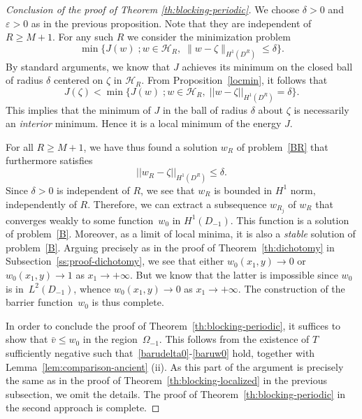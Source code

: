 \documentclass[a4paper,12pt,fullpage]{article}
\numberwithin{equation}{section}
\def\ep{\varepsilon}
\begin{document}
\begin{proof}[Conclusion of the proof of Theorem \ref{th:blocking-periodic}]

We choose $\delta>0$ and $\ep >0$ as in the previous proposition. Note that they are independent of $R\geq M+1$. For any such $R$ we consider the minimization problem
\begin{equation}\label{minim}
\min \{ J(w) \; ; w \in {\mathcal H}_R, \; \|w- \zeta\|_{H^1(D^R)}\leq \delta\}.
\end{equation}
By standard arguments, we know that $J$ achieves its minimum on the closed ball of radius $\delta$ centered on $\zeta$ in ${\mathcal H}_R$. From Proposition~\ref{locmin}, it follows that
\[
J(\zeta) < \min \{ J(w) \; ; w \in {\mathcal H}_R, \; ||w- \zeta||_{H^1(D^R)}= \delta\}.
\]
This implies that the minimum of $J$ in the ball of radius $\delta$ about $\zeta$ is necessarily an {\em interior} minimum. Hence it is a local minimum of the energy $J$. 

For all $R\geq M+1$, we have thus found a solution $w_R$ of problem~\eqref{BR} that furthermore satisfies
\[
||w_R - \zeta||_{H^1(D^R)}\leq \delta.
\]
Since $\delta >0$ is independent of  $R$, we see that $w_R$ is bounded in $H^1$ norm, independently of $R$. Therefore, we can extract a subsequence $w_{R_j}$ of $w_R$ that converges weakly to some function~$w_0$ in $H^1(D_{-1})$. This function is a solution of problem~\eqref{B}. Moreover, as a limit of local minima, it is also a {\em stable} solution of problem~\eqref{B}. Arguing precisely as in the proof of Theorem~\ref{th:dichotomy} in Subsection~\ref{ss:proof-dichotomy}, we see that either $w_0(x_1, y) \to 0$ or $w_0(x_1, y) \to 1$ as $x_1\to+\infty$. But we know that the latter is impossible since $w_0$ is in~$L^2(D_{-1})$, whence $w_0(x_1, y) \to 0$ as $x_1\to+\infty$. The construction of the barrier function~$w_0$ is thus complete. 

In order to conclude the proof of Theorem~\ref{th:blocking-periodic}, it suffices to show that $\bar{v}\le w_0$ in the region~$\Omega_{-1}$. This follows from the existence of $T$ sufficiently negative such that~\eqref{barudelta0}-\eqref{baruw0} hold, together with Lemma~\ref{lem:comparison-ancient} (ii). As this part of the argument is precisely the same as in the proof of Theorem~\ref{th:blocking-localized} in the previous subsection, we omit the details. The proof of Theorem~\ref{th:blocking-periodic} in the second approach is complete. 
\end{proof}
\end{document}
